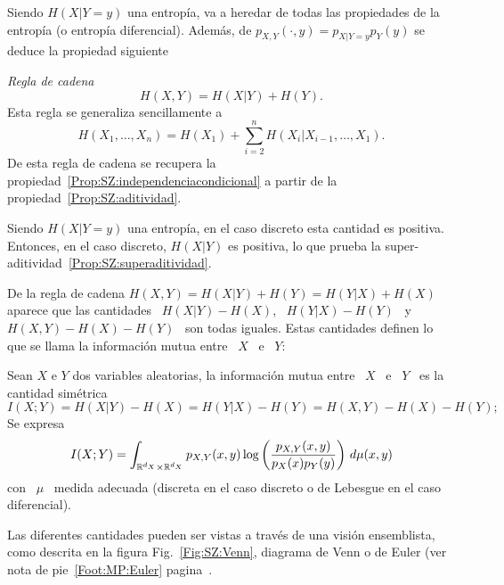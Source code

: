 Siendo $H(X|Y=y)$  una entrop\'ia, va a  heredar de todas las  propiedades de la
entrop\'ia  (o  entrop\'ia   diferencial).   Adem\'as,  de  $p_{X,Y}(\cdot,y)  =
p_{X|Y=y} p_Y(y)$ se deduce la propiedad siguiente
%
\begin{propiedades}
\item\label{Prop:SZ:cadena}  {\it Regla de  cadena}
  \[
  H(X,Y) =  H(X|Y) +  H(Y).
  \]
  Esta regla
  se generaliza sencillamente a
  \[
  H(X_1 , \ldots , X_n) = H(X_1) + \sum_{i=2}^n H(X_i|X_{i-1} , \ldots , X_1).
  \]
  De       esta       regla      de       cadena       se      recupera       la
  propiedad~\ref{Prop:SZ:independenciacondicional}     a     partir    de     la
  propiedad~\ref{Prop:SZ:aditividad}.
\end{propiedades}
%
Siendo  $H(X|Y=y)$  una  entrop\'ia,  en  el  caso  discreto  esta  cantidad  es
positiva. Entonces, en el caso discreto,  $H(X|Y)$ es positiva, lo que prueba la
super-aditividad~\ref{Prop:SZ:superaditividad}.

De la regla de  cadena $H(X,Y) = H(X|Y) + H(Y) = H(Y|X)  + H(X)$ aparece que las
cantidades \ $H(X|Y)-H(X)$, \  $H(Y|X)-H(Y)$ \ y \ $H(X,Y) - H(X)  - H(Y)$ \ son
todas iguales. Estas  cantidades definen lo que se  llama la informaci\'on mutua
entre \ $X$ \ e \ $Y$:

\begin{definicion}
\label{Def:SZ:mutua}
%
  Sean $X$ e $Y$ dos variables  aleatorias, la informaci\'on mutua entre \ $X$ \
  e  \ $Y$ \  es la  cantidad sim\'etrica
  \[
  I(X;Y) = H(X|Y)-H(X) = H(Y|X)-H(Y) = H(X,Y) - H(X) - H(Y);
  \]
  Se expresa
  \[
  I(X;Y)  =  \int_{\mathbb{R}^{d_X}  \times  \mathbb{R}^{d_X}}  p_{X,Y}(x,y)  \log  \left(
    \frac{p_{X,Y}(x,y)}{p_X(x) p_Y(y)} \right) \, d\mu(x,y)
  \]
  con \ $\mu$ \  medida adecuada (discreta en el caso discreto  o de Lebesgue en
  el caso diferencial).
\end{definicion}

Las  diferentes  cantidades  pueden  ser  vistas  a  trav\'es  de  una  visi\'on
ensemblista, como descrita en la figura Fig.~\ref{Fig:SZ:Venn}, diagrama de Venn
o de Euler (ver nota de pie~\ref{Foot:MP:Euler} pagina~\pageref{Foot:MP:Euler}.

